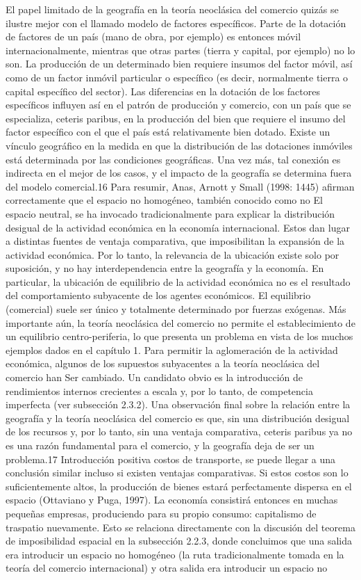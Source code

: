 El papel limitado de la geografía en la teoría neoclásica del comercio quizás se ilustre mejor con el llamado modelo de factores específicos. Parte de la dotación de factores de un país (mano de obra, por ejemplo) es entonces móvil internacionalmente, mientras que otras partes (tierra y capital, por ejemplo) no lo son. La producción de un determinado bien requiere insumos del factor móvil, así como de un factor inmóvil particular o específico (es decir, normalmente tierra o capital específico del sector). Las diferencias en la dotación de los factores específicos influyen así en el patrón de producción y comercio, con un país que se especializa, ceteris paribus, en la producción del bien que requiere el insumo del factor específico con el que el país está relativamente bien dotado. Existe un vínculo geográfico en la medida en que la distribución de las dotaciones inmóviles está determinada por las condiciones geográficas. Una vez más, tal conexión es indirecta en el mejor de los casos, y el impacto de la geografía se determina fuera del modelo comercial.16 Para resumir, Anas, Arnott y Small (1998: 1445) afirman correctamente que el espacio no homogéneo, también conocido como no El espacio neutral, se ha invocado tradicionalmente para explicar la distribución desigual de la actividad económica en la economía internacional. Estos dan lugar a distintas fuentes de ventaja comparativa, que imposibilitan la expansión de la actividad económica. Por lo tanto, la relevancia de la ubicación existe solo por suposición, y no hay interdependencia entre la geografía y la economía. En particular, la ubicación de equilibrio de la actividad económica no es el resultado del comportamiento subyacente de los agentes económicos. El equilibrio (comercial) suele ser único y totalmente determinado por fuerzas exógenas. Más importante aún, la teoría neoclásica del comercio no permite el establecimiento de un equilibrio centro-periferia, lo que presenta un problema en vista de los muchos ejemplos dados en el capítulo 1. Para permitir la aglomeración de la actividad económica, algunos de los supuestos subyacentes a la teoría neoclásica del comercio han Ser cambiado. Un candidato obvio es la introducción de rendimientos internos crecientes a escala y, por lo tanto, de competencia imperfecta (ver subsección 2.3.2). Una observación final sobre la relación entre la geografía y la teoría neoclásica del comercio es que, sin una distribución desigual de los recursos y, por lo tanto, sin una ventaja comparativa, ceteris paribus ya no es una razón fundamental para el comercio, y la geografía deja de ser un problema.17 Introducción positiva costos de transporte, se puede llegar a una conclusión similar incluso si existen ventajas comparativas. Si estos costos son lo suficientemente altos, la producción de bienes estará perfectamente dispersa en el espacio (Ottaviano y Puga, 1997). La economía consistirá entonces en muchas pequeñas empresas, produciendo para su propio consumo: capitalismo de traspatio nuevamente. Esto se relaciona directamente con la discusión del teorema de imposibilidad espacial en la subsección 2.2.3, donde concluimos que una salida era introducir un espacio no homogéneo (la ruta tradicionalmente tomada en la teoría del comercio internacional) y otra salida era introducir un espacio no 